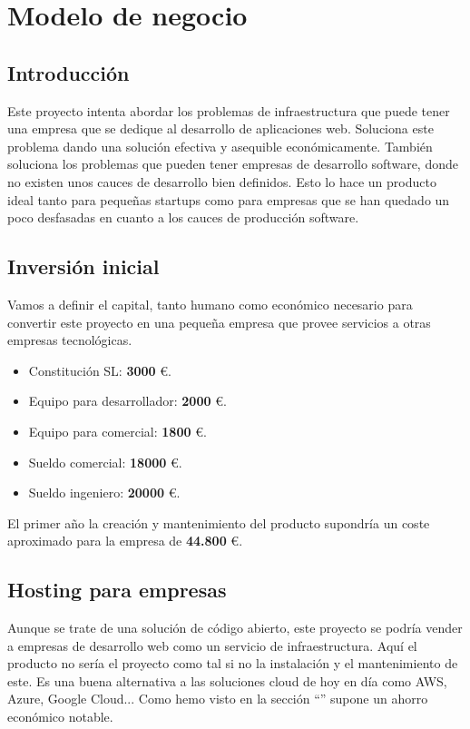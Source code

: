 \chapter {Modelo de negocio}

\section{Introducción}
        \begin{text}
                Este proyecto intenta abordar los problemas de infraestructura que puede tener una empresa que se dedique al desarrollo de aplicaciones web. Soluciona este problema dando una solución efectiva y asequible económicamente. También soluciona los problemas que pueden tener empresas de desarrollo software, donde no existen unos cauces de desarrollo bien definidos. Esto lo hace un producto ideal tanto para pequeñas startups como para empresas que se han quedado un poco desfasadas en cuanto a los cauces de producción software.
        \end{text}

\section{Inversión inicial}
        \begin{text}
                Vamos a definir el capital, tanto humano como económico necesario para convertir este proyecto en una pequeña empresa que provee servicios a otras empresas tecnológicas.

                \begin{itemize}
                        \item Constitución SL: \textbf{3000} \euro.
                        \item Equipo para desarrollador: \textbf{2000} \euro.
                        \item Equipo para comercial: \textbf{1800} \euro.
                        \item Sueldo comercial: \textbf{18000} \euro.
                        \item Sueldo ingeniero: \textbf{20000} \euro.
                \end{itemize}

                El primer año la creación y mantenimiento del producto supondría un coste aproximado para la empresa de \textbf{44.800} \euro.
        \end{text}

\section{Hosting para empresas}
        \begin{text}
        		Aunque se trate de una solución de código abierto, este proyecto se podría vender a empresas de desarrollo web como un servicio de infraestructura. Aquí el producto no sería el proyecto como tal si no la instalación y el mantenimiento de este. Es una buena alternativa a las soluciones cloud de hoy en día como AWS, Azure, Google Cloud... Como hemo visto en la sección ``'' supone un ahorro económico notable.
        \end{text}

